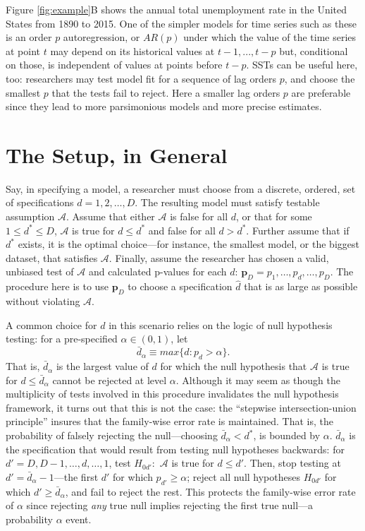 \documentclass[sts]{imsart}\usepackage[]{graphicx}\usepackage[]{color}
\newcommand{\dalphaU}{\bar{d}_\alpha}
\newcommand{\dstar}{d^*}
\begin{document}
Figure \ref{fig:example}B shows the annual total unemployment rate in the
United States from 1890 to 2015.
One of the simpler models for time series such as these is an order
$p$ autoregression, or $AR(p)$ under which the value of the time
series at point $t$ may depend on its historical values at
$t-1,...,t-p$ but, conditional on those, is independent of values at
points before $t-p$.
SSTs can be useful here, too: researchers may test model fit for a
sequence of lag orders $p$, and choose the smallest $p$ that the tests
fail to reject.
Here a smaller lag orders $p$ are preferable since they lead to more
parsimonious models and more precise estimates.



\section{The Setup, in General}\label{sec:setup}

Say, in specifying a model, a researcher must choose from a discrete,
ordered, set of specifications $d=1,2,\dots,D$.
The resulting model must satisfy testable assumption $\mathcal{A}$.
Assume that either $\mathcal{A}$ is false for all $d$, or that for
some $1\le \dstar\le D$, $\mathcal{A}$ is true for $d\le \dstar$ and false
for all $d>\dstar$.
Further assume that if $\dstar$ exists, it is the optimal choice---for
instance, the smallest model, or the biggest dataset, that satisfies
$\mathcal{A}$.
Finally, assume the researcher has chosen a valid, unbiased test of
$\mathcal{A}$ and calculated p-values for each $d$:
$\bm{p}_D=p_1,\dots,p_d,\dots,p_D$.
The procedure here is to use $\bm{p}_D$ to choose a specification
$\hat{d}$ that is as large as possible without violating
$\mathcal{A}$.


A common choice for $d$ in this scenario relies on the logic of null
hypothesis testing: for a pre-specified $\alpha \in (0,1)$, let
\begin{equation*}
\dalphaU \equiv max\{d : p_d>\alpha\}.
\end{equation*}
That is, $\dalphaU$ is the largest value of $d$ for which the
null hypothesis that $\mathcal{A}$ is true for $d\le \dalphaU$
cannot be rejected at level $\alpha$.
Although it may seem as though the multiplicity of tests involved in
this procedure invalidates the null hypothesis framework, it turns out
that this is not the case: the ``stepwise intersection-union
principle'' \citet{berger1988, rosenbaum2008,hansen2015} insures that the
family-wise error rate is maintained.
That is, the probability of falsely rejecting the null---choosing
$\dalphaU<\dstar$, is bounded by $\alpha$.
$\dalphaU$ is the specification that would result from testing null
hypotheses backwards: for $d'=D,D-1,\dots,d,\dots,1$, test $H_{0d'}:$
$\mathcal{A}$ is true for $d\le d'$.
Then, stop testing at $d'=\dalphaU -1$---the first $d'$ for which
$p_{d'} \ge \alpha$; reject all null hypotheses $H_{0d'}$ for which
$d'\ge \dalphaU$, and fail to reject the rest.
This protects the family-wise error rate of $\alpha$ since rejecting
\emph{any} true null implies rejecting the first true null---a
probability $\alpha$ event.
\end{document}
